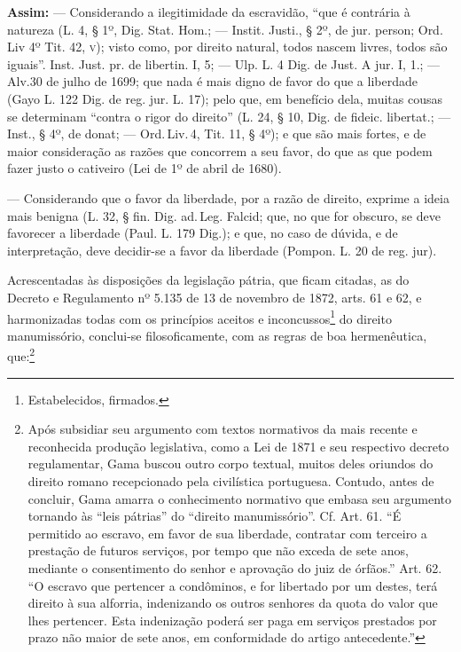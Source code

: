 \noindent\textbf{Assim:}
--- Considerando a ilegitimidade da escravidão, ``que é contrária à
natureza (L. 4, § 1º, Dig. Stat. Hom.; --- Instit. Justi., § 2º, de jur.
person; Ord.\,Liv 4º Tit. 42, \textsc{v}); visto como, por direito natural, todos
nascem livres, todos são iguais''. Inst. Just. pr. de libertin. I, 5; ---
Ulp. L. 4 Dig. de Just. A jur. I, 1.; --- Alv.30 de julho de 1699; que nada é
mais digno de favor do que a liberdade (Gayo L. 122 Dig. de reg. jur. L.
17); pelo que, em benefício dela, muitas cousas se determinam ``contra o
rigor do direito'' (L. 24, § 10, Dig. de fideic. libertat.; --- Inst., §
4º, de donat; --- Ord.\,Liv.\,4, Tit. 11, § 4º); e que são mais fortes, e de
maior consideração as razões que concorrem a seu favor, do que as que
podem fazer justo o cativeiro (Lei de 1º de abril de 1680).

--- Considerando que o favor da liberdade, por a razão de direito,
exprime a ideia mais benigna (L. 32, § fin. Dig. ad.\,Leg. Falcid; que,
no que for obscuro, se deve favorecer a liberdade (Paul. L. 179 Dig.); e
que, no caso de dúvida, e de interpretação, deve decidir-se a favor da
liberdade (Pompon. L. 20 de reg. jur).

Acrescentadas às disposições da legislação pátria, que ficam citadas, as
do Decreto e Regulamento nº 5.135 de 13 de novembro de 1872, arts. 61 e
62, e harmonizadas todas com os princípios aceitos e
inconcussos\footnote{Estabelecidos, firmados.} do direito
manumissório, conclui-se filosoficamente, com as regras de boa
hermenêutica, que:\footnote{Após subsidiar seu argumento com textos
  normativos da mais recente e reconhecida produção legislativa, como a
  Lei de 1871 e seu respectivo decreto regulamentar, Gama buscou outro
  corpo textual, muitos deles oriundos do direito romano recepcionado
  pela civilística portuguesa. Contudo, antes de concluir, Gama amarra o
  conhecimento normativo que embasa seu argumento tornando às ``leis
  pátrias'' do ``direito manumissório''. Cf. Art. 61. ``É permitido ao
  escravo, em favor de sua liberdade, contratar com terceiro a prestação
  de futuros serviços, por tempo que não exceda de sete anos, mediante o
  consentimento do senhor e aprovação do juiz de órfãos.'' Art. 62. ``O
  escravo que pertencer a condôminos, e for libertado por um destes,
  terá direito à sua alforria, indenizando os outros senhores da quota
  do valor que lhes pertencer. Esta indenização poderá ser paga em
  serviços prestados por prazo não maior de sete anos, em conformidade
  do artigo antecedente.''}

